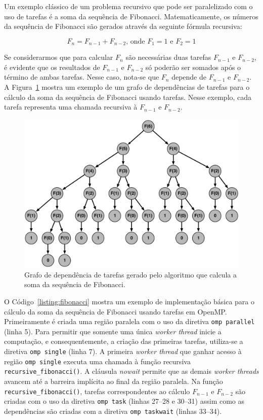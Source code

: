 \documentclass{SBCbookchapter}
\begin{document}
	Um exemplo clássico de um problema recursivo que pode ser paralelizado com o uso de tarefas é a soma da
	sequência de Fibonacci. Matematicamente, os números da sequência de Fibonacci são gerados através da
	seguinte fórmula recursiva:
	
	\begin{equation}
		F_n = F_{n-1} + F_{n-2} \text{, onde } F_1=1 \text{ e } F_2=1
	\end{equation}

	Se considerarmos que para calcular $F_n$ são necessárias duas tarefas $F_{n-1}$ e $F_{n-2}$, é evidente que
	os resultados de $F_{n-1}$ e $F_{n-2}$ só poderão ser somados após o término de ambas tarefas. Nesse caso,
	nota-se que $F_n$ depende de $F_{n-1}$ e $F_{n-2}$. A Figura~\ref{fig:fibonacci} mostra um exemplo de um
	grafo de dependências de tarefas para o cálculo da soma da sequência de Fibonacci usando tarefas. Nesse
	exemplo, cada tarefa representa uma chamada recursiva à $F_{n-1}$ e $F_{n-2}$.

		\begin{figure}[t]
			\centering
			\includegraphics[width=0.8\linewidth]{img/fibonacci}
			\caption{Grafo de dependência de tarefas gerado pelo algoritmo que calcula a soma da sequência
			de Fibonacci.}\label{fig:fibonacci}
		\end{figure}

	O Código~\ref{listing:fibonacci} mostra um exemplo de implementação básica para o cálculo da soma da sequência
	de Fibonacci usando tarefas em OpenMP. Primeiramente é criada uma região paralela com o uso da diretiva
	\texttt{omp parallel} (linha 5). Para permitir que somente uma única \textit{worker thread} inicie a computação, e
	consequentemente, a criação das primeiras tarefas, utiliza-se a diretiva \texttt{omp single} (linha 7). A primeira
	\textit{worker thread} que ganhar acesso à região \texttt{omp single} executa uma chamada à função recursiva 
	\texttt{recursive\_fibonacci()}. A cláusula \textit{nowait} permite que as demais \textit{worker threads} avancem até
	a barreira implícita ao final da região paralela. Na função \texttt{recursive\_fibonacci()}, tarefas correspondentes ao
	cálculo $F_{n-1}$ e $F_{n-2}$ são criadas com o uso da diretiva \texttt{omp task} (linhas 27--28 e 30--31) assim
	como as dependências são criadas com a diretiva \texttt{omp taskwait} (linhas 33--34).
	
\end{document}
